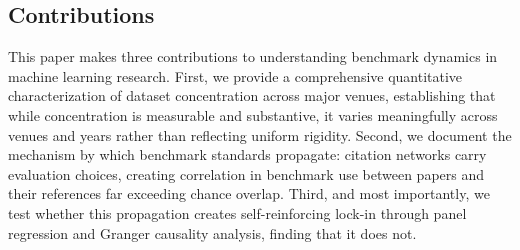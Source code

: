 \subsection{Contributions}

This paper makes three contributions to understanding benchmark dynamics in machine learning research. First, we provide a comprehensive quantitative characterization of dataset concentration across major venues, establishing that while concentration is measurable and substantive, it varies meaningfully across venues and years rather than reflecting uniform rigidity. Second, we document the mechanism by which benchmark standards propagate: citation networks carry evaluation choices, creating correlation in benchmark use between papers and their references far exceeding chance overlap. Third, and most importantly, we test whether this propagation creates self-reinforcing lock-in through panel regression and Granger causality analysis, finding that it does not.
